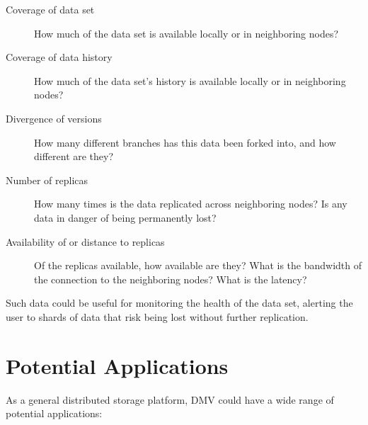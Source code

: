 \begin{description}

  \item[Coverage of data set] How much of the data set is available locally or
    in neighboring nodes?

  \item[Coverage of data history] How much of the data set's history is
    available locally or in neighboring nodes?

  \item[Divergence of versions] How many different branches has this data been
    forked into, and how different are they?

  \item[Number of replicas] How many times is the data replicated across
    neighboring nodes? Is any data in danger of being permanently lost?

  \item[Availability of or distance to replicas] Of the replicas available, how
    available are they? What is the bandwidth of the connection to the
    neighboring nodes? What is the latency?

\end{description}

Such data could be useful for monitoring the health of the data set, alerting
the user to shards of data that risk being lost without further replication.

%


\section{Potential Applications}

As a general distributed storage platform, \gls{DMV} could have a wide range of
potential applications:

